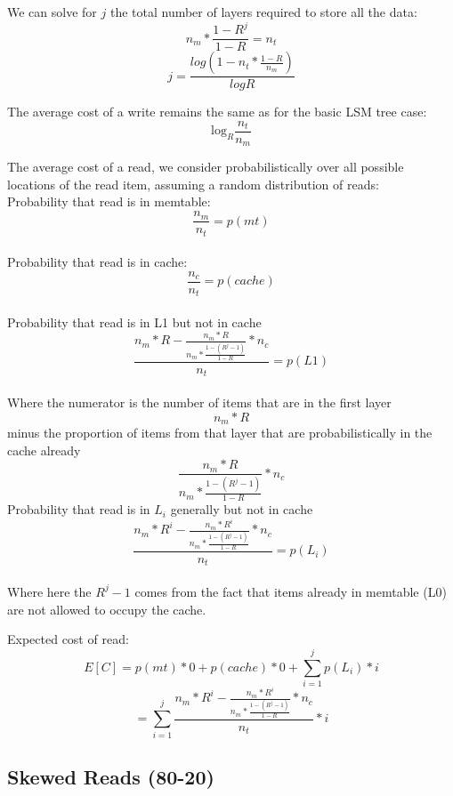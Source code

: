 \documentclass{sig-alternate-05-2015}
\begin{document}
We can solve for $j$ the total number of layers required to store all the data: \\
$$n_m * \frac{1-R^j}{1-R} = n_t$$
$$j = \frac{log(1-n_t*\frac{1-R}{n_m})}{log R}$$

The average cost of a write remains the same as for the basic LSM tree case:
$$
\textrm{log}_{R} \frac{n_t}{n_m}
$$

The average cost of a read, we consider probabilistically over all possible locations of the read item, assuming a random distribution of reads: \\
Probability that read is in memtable:
$$\frac{n_m}{n_t}  = p(mt)$$\\
Probability that read is in cache:
$$\frac{n_c}{n_t} = p(cache)$$ \\
Probability that read is in L1 but not in cache
$$ \frac{n_m * R - \frac{n_m * R}{n_m * \frac{1-(R^j-1)}{1-R}} * n_c}{n_t}  = p(L1)$$\\
Where the numerator is the number of items that are in the first layer $$n_m * R$$ minus the proportion of items from that layer that are probabilistically in the cache already $$\frac{n_m * R}{n_m * \frac{1-(R^j-1)}{1-R}} * n_c$$
Probability that read is in $L_i$ generally but not in cache
$$ \frac{n_m * R^i - \frac{n_m * R^i}{n_m * \frac{1-(R^j-1)}{1-R}} * n_c}{n_t}  = p(L_i)$$\\
Where here the $R^j -1$ comes from the fact that items already in memtable (L0) are not allowed to occupy the cache.

Expected cost of read:
$$E[C] = p(mt) * 0  + p(cache) * 0 + \sum_{i=1}^j p(L_i) * i$$
$$= \sum_{i=1}^j \frac{n_m * R^i - \frac{n_m * R^i}{n_m * \frac{1-(R^j-1)}{1-R}} * n_c}{n_t}  * i$$

\subsection{Skewed Reads (80-20)}
\end{document}
